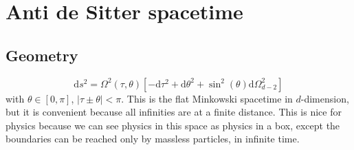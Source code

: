 \documentclass[a4paper]{book}
\theoremstyle{definition}
\theoremstyle{remark}
\begin{document}
\chapter{Anti de Sitter spacetime}

\section{Geometry}

\begin{equation}
    \text{d}s^2 = \Omega ^2 (\tau, \theta) [-\text{d}\tau^2 + \text{d}\theta ^2 + \sin ^2(\theta) \text{d}\Omega^2_{d-2}]
\end{equation}
with $\theta \in [0, \pi]$, $|\tau \pm \theta| < \pi$. This is the flat Minkowski spacetime in $d$-dimension, but it is convenient because all infinities are at a finite distance. This is nice for physics because we can see physics in this space as physics in a box, except the boundaries can be reached only by massless particles, in infinite time. \par \medskip 
\end{document}
